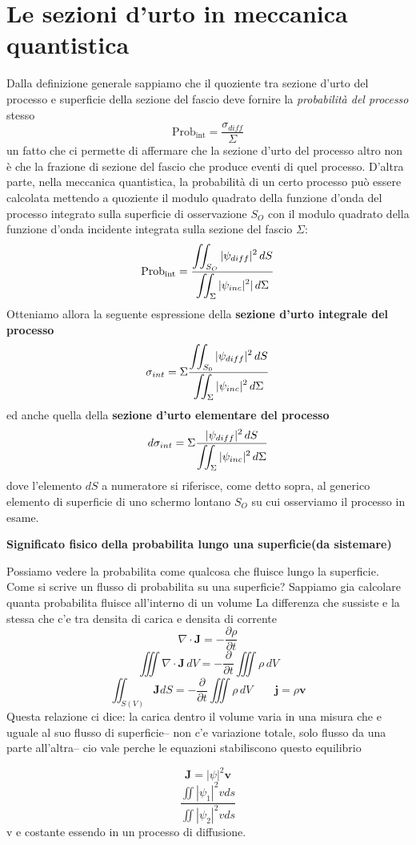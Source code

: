 \section{Le sezioni d'urto in meccanica quantistica}\label{sec:le-sezioni-d'urto-in-meccanica-quantistica}
Dalla definizione generale sappiamo che il quoziente tra sezione d'urto
del processo e superficie della sezione del fascio deve fornire la
\emph{probabilità del processo} stesso \[
										   \text{Prob}_{\text{int}}  = \frac{\sigma_{diff}}{\Sigma}
\] un fatto che ci permette di affermare che la sezione d'urto del
processo altro non è che la frazione di sezione del fascio che produce
eventi di quel processo.
D'altra parte, nella meccanica quantistica, la
probabilità di un certo processo può essere calcolata mettendo a
quoziente il modulo quadrato della funzione d'onda del processo
integrato sulla superficie di osservazione \(S_O\) con il modulo
quadrato della funzione d'onda incidente integrata sulla sezione del
fascio \(\Sigma\):
\[
	\text{Prob}_{\text{int}}  = \fraclarg{ \iint_{S_O} |\psi_{diff}|^2 \, dS}{\iint_{\Sigma} |\psi_{inc}|^2| \, d \Sigma}
\]
Otteniamo allora la seguente espressione della \textbf{sezione d'urto
integrale del processo}
\begin{equation}
	\sigma_{int} = \Sigma \fraclarg{\iint_{S_0} |\psi_{diff}|^2 \, dS}{\iint_{\Sigma}|\psi_{inc}|^2 \, d \Sigma}
\end{equation} ed anche quella della \textbf{sezione d'urto elementare
del processo}
\begin{equation}
	d \sigma_{int} = \Sigma \fraclarg{|\psi_{diff}|^2 \, dS}{\iint_{\Sigma}|\psi_{inc}|^2 \, d \Sigma}
\end{equation}
dove l'elemento \(dS\) a numeratore si riferisce, come
detto sopra, al generico elemento di superficie di uno schermo lontano
\(S_O\) su cui osserviamo il processo in esame.
\marginnote
{
	\textbf{Significato fisico della probabilita lungo una superficie(da sistemare)}

	Possiamo vedere la probabilita come qualcosa che fluisce lungo la superficie. Come si scrive un flusso di probabilita su una superficie? Sappiamo gia calcolare quanta probabilita fluisce all'interno di un volume La differenza che sussiste e la stessa che c'e tra densita di carica e densita di corrente \[
		\nabla \cdot \bm{J} = - \frac{\partial \rho}{\partial t}
	\] \[
		\iiint \nabla \cdot \bm{J} \,dV =  - \frac{\partial }{\partial t}\iiint \rho \, dV
	\] \[
		\iint_{S(V)} \bm{J}dS = - \frac{\partial }{\partial t}\iiint \rho \, dV  \qquad \bm{j} = \rho \bm{v}
	\] Questa relazione ci dice: la carica dentro il volume varia in una misura che e uguale al suo flusso di superficie--\> non c'e variazione totale, solo flusso da una parte all'altra--\> cio vale perche le equazioni stabiliscono questo equilibrio

	\[
		\bm{J} = |\psi|^2\bm{v}
	\] \[
		\frac{\iint |\psi_1|^2vds}{\iint |\psi_2|^2vds}
	\] v e costante essendo in un processo di diffusione.
}

